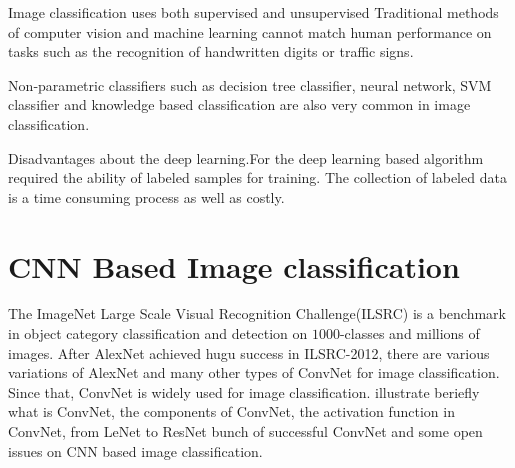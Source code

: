 \documentclass[10pt,twocolumn,letterpaper]{article}
\begin{document}
Image classification uses both supervised and unsupervised
Traditional  methods  of  computer  vision  and  machine
learning cannot match human performance on tasks such
as the recognition of handwritten digits or traffic signs.\cite{ciregancolumn}

Non‐parametric  classifiers  such  as  decision tree   classifier,  neural   network,   SVM   classifier and knowledge based classification are also very common in image classification.

Disadvantages about the deep learning.For the deep learning based algorithm required the ability of labeled samples for training. The collection of labeled data is a time consuming process as well as costly.



\section{CNN Based Image classification}

\par
The ImageNet Large Scale Visual Recognition Challenge(ILSRC) is a benchmark in object category classification and detection on $1000$-classes and millions of images. After AlexNet achieved hugu success in ILSRC-2012, there are various variations of AlexNet\cite{krizhevsky2012imagenet} and many other types of ConvNet for image classification. Since that, ConvNet is widely used for image classification. \cite{aloysius2017review} illustrate beriefly what is ConvNet, the components of ConvNet, the activation function in ConvNet, from LeNet to ResNet bunch of successful ConvNet and some open issues on CNN based image classification.
\end{document}
